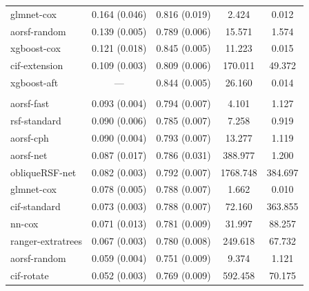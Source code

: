 \documentclass[twoside,11pt]{article}\usepackage[]{graphicx}\usepackage[]{xcolor}
\newenvironment{knitrout}{}{} %
\begin{document}
\begin{knitrout}
\begin{longtable}[t]{lcccc}
\hspace{1em}glmnet-cox & 0.164 (0.046) & 0.816 (0.019) & 2.424 & 0.012\\
\hspace{1em}aorsf-random & 0.139 (0.005) & 0.789 (0.006) & 15.571 & 1.574\\
\hspace{1em}xgboost-cox & 0.121 (0.018) & 0.845 (0.005) & 11.223 & 0.015\\
\hspace{1em}cif-extension & 0.109 (0.003) & 0.809 (0.006) & 170.011 & 49.372\\
\hspace{1em}xgboost-aft & --- & 0.844 (0.005) & 26.160 & 0.014\\
\addlinespace[0.3em]
\multicolumn{5}{l}{\textit{\textbf{ARIC; stroke, n = 13623, p = 41}}}\\
\hline
\hspace{1em}aorsf-fast & 0.093 (0.004) & 0.794 (0.007) & 4.101 & 1.127\\
\hspace{1em}rsf-standard & 0.090 (0.006) & 0.785 (0.007) & 7.258 & 0.919\\
\hspace{1em}aorsf-cph & 0.090 (0.004) & 0.793 (0.007) & 13.277 & 1.119\\
\hspace{1em}aorsf-net & 0.087 (0.017) & 0.786 (0.031) & 388.977 & 1.200\\
\hspace{1em}obliqueRSF-net & 0.082 (0.003) & 0.792 (0.007) & 1768.748 & 384.697\\
\hspace{1em}glmnet-cox & 0.078 (0.005) & 0.788 (0.007) & 1.662 & 0.010\\
\hspace{1em}cif-standard & 0.073 (0.003) & 0.788 (0.007) & 72.160 & 363.855\\
\hspace{1em}nn-cox & 0.071 (0.013) & 0.781 (0.009) & 31.997 & 88.257\\
\hspace{1em}ranger-extratrees & 0.067 (0.003) & 0.780 (0.008) & 249.618 & 67.732\\
\hspace{1em}aorsf-random & 0.059 (0.004) & 0.751 (0.009) & 9.374 & 1.121\\
\hspace{1em}cif-rotate & 0.052 (0.003) & 0.769 (0.009) & 592.458 & 70.175\\

\end{longtable}
\end{knitrout}
\end{document}
